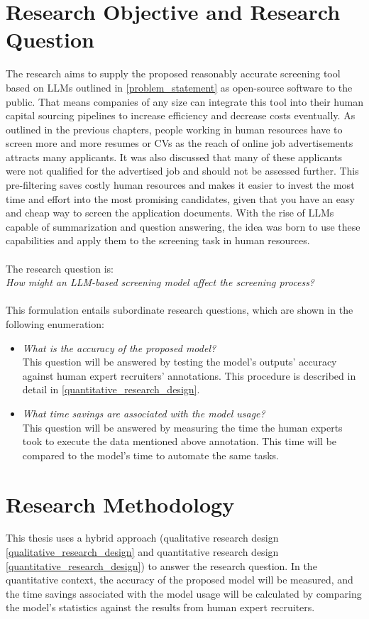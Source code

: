 \documentclass[draft,final]{thesisclass} %
\begin{document}
\section{Research Objective and Research Question} \label{research_objective_and_research_question}
The research aims to supply the proposed reasonably accurate screening tool based on \gls{LLM}s outlined in \ref{problem_statement} as open-source software to the public.
That means companies of any size can integrate this tool into their human capital sourcing pipelines to increase efficiency and decrease costs eventually.
As outlined in the previous chapters, people working in human resources have to screen more and more resumes or \acs{CV}s as the reach of online job advertisements attracts many applicants.
It was also discussed that many of these applicants were not qualified for the advertised job and should not be assessed further.
This pre-filtering saves costly human resources and makes it easier to invest the most time and effort into the most promising candidates, given that you have an easy and cheap way to screen the application documents.
With the rise of \gls{LLM}s capable of summarization and question answering, the idea was born to use these capabilities and apply them to the screening task in human resources.
\\\\
The research question is:\\
\textit{How might an \gls{LLM}-based screening model affect the screening process?}\\\\
This formulation entails subordinate research questions, which are shown in the following enumeration:
\begin{itemize}
    \item \textit{What is the accuracy of the proposed model?}\\
    This question will be answered by testing the model's outputs' accuracy against human expert recruiters' annotations.
    This procedure is described in detail in \ref{quantitative_research_design}.
    \item \textit{What time savings are associated with the model usage?}\\
    This question will be answered by measuring the time the human experts took to execute the data mentioned above annotation.
    This time will be compared to the model's time to automate the same tasks.
\end{itemize}

\section{Research Methodology} \label{research_methodology}
This thesis uses a hybrid approach (qualitative research design \ref{qualitative_research_design} and quantitative research design \ref{quantitative_research_design}) to answer the research question.
In the quantitative context, the accuracy of the proposed model will be measured, and the time savings associated with the model usage will be calculated by comparing the model's statistics against the results from human expert recruiters.
\end{document}
